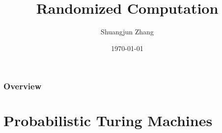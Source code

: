 \documentclass{beamer}
\title[Short title]{Randomized Computation} %
\author{Shuangjun Zhang} %
\institute[FDU] %
{
Fudan University \\ %
\medskip
\textit{zhangsj17@fudan.edu.cn} %
}
\date{\today} %
\begin{document}
\begin{frame}
\titlepage %
\end{frame}

\begin{frame}
\frametitle{Overview} %
\tableofcontents %
\end{frame}


\section{Probabilistic Turing Machines}
\end{document}
